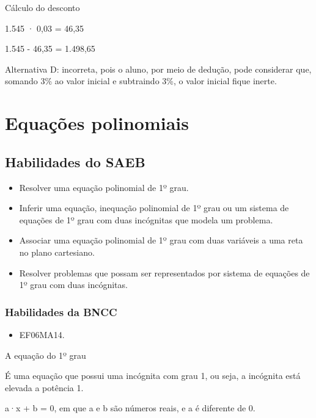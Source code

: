 Cálculo do desconto

1.545 · 0,03 = 46,35

1.545 - 46,35 = 1.498,65

Alternativa D: incorreta, pois o aluno, por meio de dedução, pode
considerar que, somando 3\% ao valor inicial e subtraindo 3\%, o valor
inicial fique inerte.

\chapter{Equações polinomiais}

\section{Habilidades do SAEB} 

\begin{itemize}

\item
Resolver uma equação polinomial de 1º grau.

\item
  Inferir uma equação, inequação polinomial de 1º grau ou um sistema de
  equações de 1º grau com duas incógnitas que modela um problema.

\item
  Associar uma equação polinomial de 1º grau com duas variáveis a uma
  reta no plano cartesiano.

\item
  Resolver problemas que possam ser representados por sistema de
  equações de 1º grau com duas incógnitas.

\end{itemize}

\subsection{Habilidades da BNCC} 

\begin{itemize}
  
  \item EF06MA14.

\end{itemize}

A equação do 1º grau~

É uma equação que possui uma incógnita com grau 1, ou seja, a incógnita
está elevada a potência 1.

a·x + b = 0, em que a e b são números reais, e a é diferente de 0.

